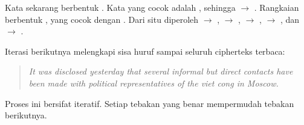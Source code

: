 Kata  sekarang berbentuk . Kata yang cocok adalah
, sehingga  $\rightarrow$ . Rangkaian
 berbentuk , yang cocok dengan
. Dari situ diperoleh  $\rightarrow$ ,
 $\rightarrow$ ,  $\rightarrow$ ,
 $\rightarrow$ , dan  $\rightarrow$ .

Iterasi berikutnya melengkapi sisa huruf sampai seluruh cipherteks terbaca:
\begin{quote}
\itshape
It was disclosed yesterday that several informal but direct contacts have
been made with political representatives of the viet cong in Moscow.
\end{quote}
Proses ini bersifat iteratif. Setiap tebakan yang benar mempermudah tebakan
berikutnya.
